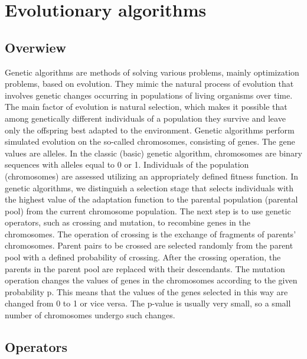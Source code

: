 \FloatBarrier
\section{Evolutionary algorithms}

\FloatBarrier
\subsection{Overwiew}
Genetic algorithms are methods of solving various problems, mainly optimization problems, 
based on evolution. 
They mimic the natural process of evolution that involves genetic changes occurring in populations 
of living organisms over time. 
The main factor of evolution is natural selection, which makes it possible that among genetically 
different individuals of a population they survive and leave only the offspring best adapted to 
the environment. 
Genetic algorithms perform simulated evolution on the so-called chromosomes, consisting of genes.
The gene values are alleles. In the classic (basic) genetic algorithm, chromosomes are binary 
sequences with alleles equal to 0 or 1. 
Individuals of the population (chromosomes) are assessed utilizing an appropriately defined fitness 
function. 
In genetic algorithms, we distinguish a selection stage that selects individuals with the highest 
value of the adaptation function to the parental population (parental pool) from the current 
chromosome population. 
The next step is to use genetic operators, such as crossing and mutation, to recombine genes 
in the chromosomes. 
The operation of crossing is the exchange of fragments of parents' chromosomes. Parent pairs to be 
crossed are selected randomly from the parent pool with a defined probability of crossing. 
After the crossing operation, the parents in the parent pool are replaced with their descendants. 
The mutation operation changes the values of genes in the chromosomes according to the given 
probability p. 
This means that the values of the genes selected in this way are changed from 0 to 1 or 
vice versa. 
The p-value is usually very small, so a small number of chromosomes undergo such changes.


\FloatBarrier
\subsection{Operators}

